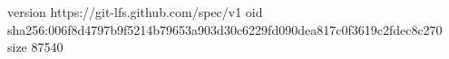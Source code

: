 version https://git-lfs.github.com/spec/v1
oid sha256:006f8d4797b9f5214b79653a903d30c6229fd090dea817c0f3619c2fdec8c270
size 87540
